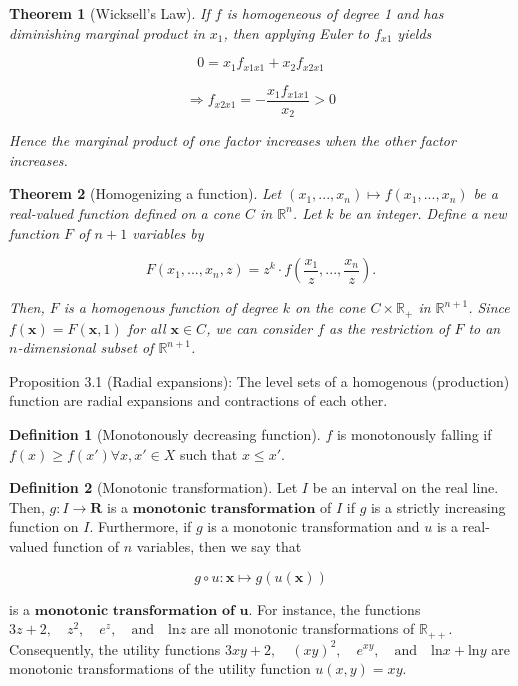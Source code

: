 \documentclass{article}
\newtheorem{theorem}{Theorem}
\theoremstyle{definition}
\newtheorem{definition}{Definition}
\theoremstyle{Solution}
\begin{document}
\begin{theorem}[Wicksell's Law]
If \(f\) is homogeneous of degree 1 and has diminishing marginal product in \(x_1\), then applying Euler to \(f_{x1}\) yields

\[
0=x_1f_{x1x1}+x_2f_{x2x1} 
\]

\[
\Rightarrow f_{x2x1}=-\frac{x_1f_{x1x1}}{x_2} > 0
\]

Hence the marginal product of one factor increases when the other factor increases.
\end{theorem}


\begin{theorem}[Homogenizing a function]
Let $(x_1,...,x_n)\mapsto f(x_1,...,x_n)$ be a real-valued function defined on a cone $C$ in \(\mathbb{R}^n\). Let \(k\) be an integer. Define a new function $F$ of $n+1$ variables by 

\begin{equation}
	F(x_1,...,x_n,z)=z^k\cdot f \left(\frac{x_1}{z},...,\frac{x_n}{z}\right).
\end{equation}

Then, $F$ is a homogenous function of degree $k$ on the cone $C \times \mathbb{R}_+$ in $\mathbb{R}^{n+1}$. Since $f(\textbf{x})=F(\textbf{x},1)$ for all $\textbf{x} \in C$, we can consider $f$ as the restriction of $F$ to an $n$-dimensional subset of $\mathbb{R}^{n+1}$.
\end{theorem}

\vspace{1em}

Proposition 3.1 (Radial expansions): The level sets of a homogenous (production) function are radial expansions and contractions of each other.

\vspace{1em}

\begin{definition}[Monotonously decreasing function] $f$ is monotonously falling if $f(x) \geq f(x') \forall x,x' \in X$ such that $x \leq x'$.
\end{definition}

\begin{definition}[Monotonic transformation] 
Let $I$ be an interval on the real line. Then, $g:I\rightarrow \textbf{R}$ is a $\textbf{monotonic transformation}$ of $I$ if $g$ is a strictly increasing function on $I$. Furthermore, if $g$ is a monotonic transformation and $u$ is a real-valued function of $n$ variables, then we say that

\begin{equation}
	g \circ u: \mathbf{x} \mapsto g(u(\mathbf{x}))
\end{equation}

is a $\textbf{monotonic transformation of u}$. For instance, the functions $3z+2, \quad z^2, \quad e^z, \quad \text{and} \quad \text{ln} z$ are all monotonic transformations of $\mathbb{R}_{++}$. Consequently, the utility functions $3xy+2, \quad (xy)^2, \quad e^{xy}, \quad \text{and} \quad \text{ln} x+\text{ln} y$ are monotonic transformations of the utility function $u(x,y)=xy$.
\end{definition}
\end{document}
